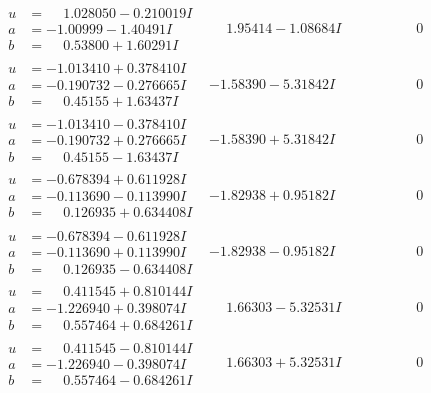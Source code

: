 \documentclass[1p]{elsarticle_modified}
\theoremstyle{definition}
\begin{document}
$$\begin{array}{c|c|c}
\begin{aligned}
u &= \phantom{-}1.028050 - 0.210019 I \\
a &= -1.00999 - 1.40491 I \\
b &= \phantom{-}0.53800 + 1.60291 I\end{aligned}
 & \phantom{-}1.95414 - 1.08684 I & \phantom{-0.000000 } 0 \\ \hline\begin{aligned}
u &= -1.013410 + 0.378410 I \\
a &= -0.190732 - 0.276665 I \\
b &= \phantom{-}0.45155 + 1.63437 I\end{aligned}
 & -1.58390 - 5.31842 I & \phantom{-0.000000 } 0 \\ \hline\begin{aligned}
u &= -1.013410 - 0.378410 I \\
a &= -0.190732 + 0.276665 I \\
b &= \phantom{-}0.45155 - 1.63437 I\end{aligned}
 & -1.58390 + 5.31842 I & \phantom{-0.000000 } 0 \\ \hline\begin{aligned}
u &= -0.678394 + 0.611928 I \\
a &= -0.113690 - 0.113990 I \\
b &= \phantom{-}0.126935 + 0.634408 I\end{aligned}
 & -1.82938 + 0.95182 I & \phantom{-0.000000 } 0 \\ \hline\begin{aligned}
u &= -0.678394 - 0.611928 I \\
a &= -0.113690 + 0.113990 I \\
b &= \phantom{-}0.126935 - 0.634408 I\end{aligned}
 & -1.82938 - 0.95182 I & \phantom{-0.000000 } 0 \\ \hline\begin{aligned}
u &= \phantom{-}0.411545 + 0.810144 I \\
a &= -1.226940 + 0.398074 I \\
b &= \phantom{-}0.557464 + 0.684261 I\end{aligned}
 & \phantom{-}1.66303 - 5.32531 I & \phantom{-0.000000 } 0 \\ \hline\begin{aligned}
u &= \phantom{-}0.411545 - 0.810144 I \\
a &= -1.226940 - 0.398074 I \\
b &= \phantom{-}0.557464 - 0.684261 I\end{aligned}
 & \phantom{-}1.66303 + 5.32531 I & \phantom{-0.000000 } 0 \\ \hline\begin{aligned}

\end{aligned}
\end{array}$$
\end{document}

